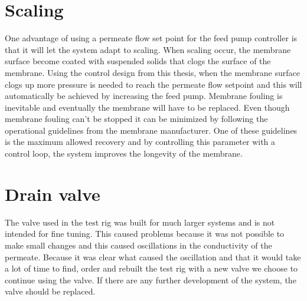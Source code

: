 \section{Scaling}
One advantage of using a permeate flow set point for the feed pump controller is that it will let the system adapt to scaling. When scaling occur, the membrane surface become coated with suspended solids that clogs the surface of the membrane. Using the control design from this thesis, when the membrane surface clogs up more pressure is needed to reach the permeate flow setpoint and this will automatically be achieved by increasing the feed pump. Membrane fouling is inevitable and eventually the membrane will have to be replaced. Even though membrane fouling can't be stopped it can be minimized by following the operational guidelines from the membrane manufacturer. One of these guidelines is the maximum allowed recovery and by controlling this parameter with a control loop, the system improves the longevity of the membrane. 

\section{Drain valve}
The valve used in the test rig was built for much larger systems and is not intended for fine tuning. This caused problems because it was not possible to make small changes and this caused oscillations in the conductivity of the permeate. Because it was clear what caused the oscillation and that it would take a lot of time to find, order and rebuilt the test rig with a new valve we choose to continue using the valve. If there are any further development of the system, the valve should be replaced.\\
\\